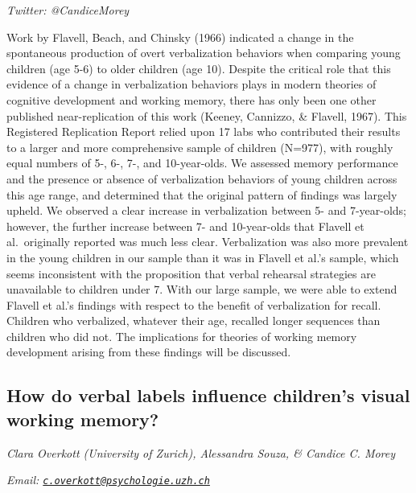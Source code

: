 \documentclass[
  12pt,
]{book}
\begin{document}
\emph{Twitter: @CandiceMorey}

Work by Flavell, Beach, and Chinsky (1966) indicated a change in the spontaneous production of overt verbalization behaviors when comparing young children (age 5-6) to older children (age 10). Despite the critical role that this evidence of a change in verbalization behaviors plays in modern theories of cognitive development and working memory, there has only been one other published near-replication of this work (Keeney, Cannizzo, \& Flavell, 1967). This Registered Replication Report relied upon 17 labs who contributed their results to a larger and more comprehensive sample of children (N=977), with roughly equal numbers of 5-, 6-, 7-, and 10-year-olds. We assessed memory performance and the presence or absence of verbalization behaviors of young children across this age range, and determined that the original pattern of findings was largely upheld. We observed a clear increase in verbalization between 5- and 7-year-olds; however, the further increase between 7- and 10-year-olds that Flavell et al.~originally reported was much less clear. Verbalization was also more prevalent in the young children in our sample than it was in Flavell et al.'s sample, which seems inconsistent with the proposition that verbal rehearsal strategies are unavailable to children under 7. With our large sample, we were able to extend Flavell et al.'s findings with respect to the benefit of verbalization for recall. Children who verbalized, whatever their age, recalled longer sequences than children who did not. The implications for theories of working memory development arising from these findings will be discussed.

\hypertarget{how-do-verbal-labels-influence-childrens-visual-working-memory}{%
\subsection{How do verbal labels influence children's visual working memory?}\label{how-do-verbal-labels-influence-childrens-visual-working-memory}}

\emph{Clara Overkott (University of Zurich), Alessandra Souza, \& Candice C. Morey}

\emph{Email: \href{mailto:c.overkott@psychologie.uzh.ch}{\nolinkurl{c.overkott@psychologie.uzh.ch}}}
\end{document}
